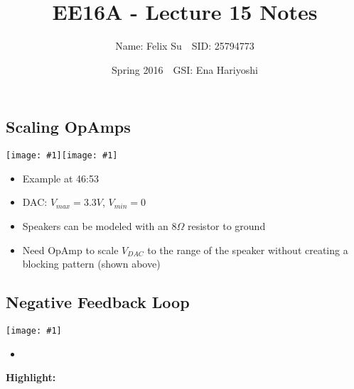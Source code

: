 \documentclass{article}\usepackage{amsmath,amssymb,amsthm,tikz,tkz-graph,color,chngpage,soul,hyperref,csquotes,graphicx,floatrow}\newcommand*{\QEDB}{\hfill\ensuremath{\square}}\newtheorem*{prop}{Proposition}\renewcommand{\theenumi}{\alph{enumi}}\usepackage[shortlabels]{enumitem}\usepackage[nobreak=true]{mdframed}\usetikzlibrary{matrix,calc}\MakeOuterQuote{"}\usepackage[margin=0.75in]{geometry} \newtheorem{theorem}{Theorem}
\title{EE16A - Lecture 15 Notes}
\author{Name: Felix Su$\quad$SID: 25794773}
\date{Spring 2016$\quad$GSI: Ena Hariyoshi}
\newcommand{\dincludegraphics}[1]{\texttt{[image: \#1]}}
\begin{document}
\maketitle

\subsection*{Scaling OpAmps}
\begin{center}\dincludegraphics{scaleop}\dincludegraphics{opvdac}\end{center}
\begin{itemize}
    \item Example at 46:53
    \item DAC: $V_{max}  = 3.3V$, $V_{min}= 0$
    \item Speakers can be modeled with an $8\Omega$ resistor to ground
    \item Need OpAmp to scale $V_{DAC}$ to the range of the speaker without creating a blocking pattern (shown above)
\end{itemize}
\subsection*{Negative Feedback Loop}
\begin{center}\dincludegraphics{nfl}\end{center}
\begin{itemize}
    \item
\end{itemize}
\begin{mdframed}
\textbf{Highlight:}\\
\end{mdframed}
\end{document}
